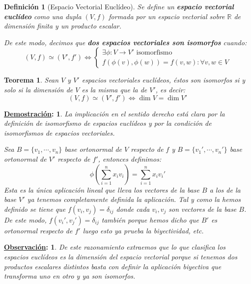 \documentclass[10pt,a4paper,openright]{book}
\theoremstyle{break}
\newtheorem*{defi}{Definición}
\newtheorem*{theo}{Teorema}
\newtheorem*{demo}{\underline{Demostración}:}
\newtheorem*{obs}{\underline{Observación}:}
\begin{document}
\begin{defi}[Espacio Vectorial Euclídeo]
Se define un \textbf{espacio vectorial euclídeo} como una dupla $(V,f)$ formada por un espacio vectorial sobre $\mathbb{R}$ de dimensión finita y un producto escalar.

De este modo, decimos que \textbf{dos espacios vectoriales son isomorfos} cuando:
$$(V,f) \simeq (V',f')\Leftrightarrow \begin{cases} \exists \phi: V\rightarrow V' \mbox{ isomorfismo} \\ f(\phi(v),\phi(w)) = f(v,w): \forall v,w\in V\end{cases}$$
\end{defi}

\begin{theo}
Sean $V$ y $V'$ espacios vectoriales euclídeos, éstos son isomorfos si y solo si la dimensión de $V$ es la misma que la de $V'$, es decir:
$$(V,f) \simeq (V',f')\Leftrightarrow \dim V = \dim V'$$
\end{theo}
\begin{demo}
La implicación en el sentido derecho está clara por la definición de isomorfismo de espacios euclídeos y por la condición de isomorfismos de espacios vectoriales.

Sea $B=\{v_1, \cdots , v_n\}$ base ortonormal de $V$ respecto de $f$ y $B=\{v_1', \cdots, v_n'\}$ base ortonormal de $V'$ respecto de $f'$, entonces definimos:
$$\phi\left(\sum_{i=1}^{n}x_iv_i\right)=\sum_{i=1}^{n}x_iv_i'$$
Esta es la única aplicación lineal que lleva los vectores de la base $B$ a los de la base $V'$ ya tenemos completamente definida la aplicación. Tal y como la hemos definido se tiene que $f(v_i,v_j) = \delta_{ij}$ donde cada $v_i, v_j$ son vectores de la base $B$. De este modo, $f(v_i',v_j') = \delta_{ij}$ también porque hemos dicho que $B'$ es ortonormal respecto de $f'$ luego esto ya prueba la biyectividad, etc.
\end{demo}

\begin{obs}
De este razonamiento extraemos que lo que clasifica los espacios euclídeos es la dimensión del espacio vectorial porque si tenemos dos productos escalares distintos basta con definir la aplicación biyectiva que transforma uno en otro y ya son isomorfos.
\end{obs}
\end{document}
